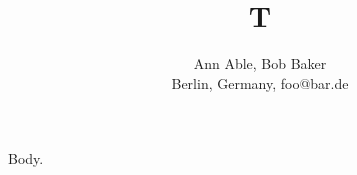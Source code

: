 \documentclass{article}
\title{T}
\author{Ann Able, Bob Baker\\ Berlin, Germany, foo@bar.de}
\begin{document}
\maketitle
Body.
\end{document}

